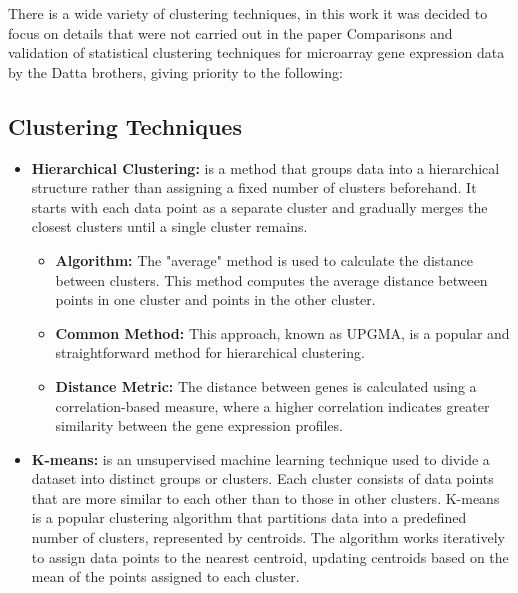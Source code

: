 \documentclass{llncs}
\begin{document}
There is a wide variety of clustering techniques, in this work it was decided to focus on details that were not carried out in the paper Comparisons and validation of statistical
clustering techniques for microarray gene
expression data by the Datta brothers, giving priority to the following:
\subsection{Clustering Techniques}


\begin{itemize}
	\item \textbf{Hierarchical Clustering:} is a method that groups data into a hierarchical structure rather than assigning a fixed number of clusters beforehand. It starts with each data point as a separate cluster and gradually merges the closest clusters until a single cluster remains.\cite{guess2002}
	
	\begin{itemize}
		\item \textbf{Algorithm:} The "average" method is used to calculate the distance between clusters. This method computes the average distance between points in one cluster and points in the other cluster.\cite{datta2003}
		
		\item \textbf{Common Method:} This approach, known as UPGMA, is a popular and straightforward method for hierarchical clustering.\cite{datta2003}
		
		\item \textbf{Distance Metric:} The distance between genes is calculated using a correlation-based measure, where a higher correlation indicates greater similarity between the gene expression profiles.\cite{datta2003}
	\end{itemize}
	
	
		
		\item \textbf{K-means:} is an unsupervised machine learning technique used to divide a dataset into distinct groups or clusters. Each cluster consists of data points that are more similar to each other than to those in other clusters. K-means is a popular clustering algorithm that partitions data into a predefined number of clusters, represented by centroids. The algorithm works iteratively to assign data points to the nearest centroid, updating centroids based on the mean of the points assigned to each cluster.\cite{steinley2006}
		

\end{itemize}
\end{document}
